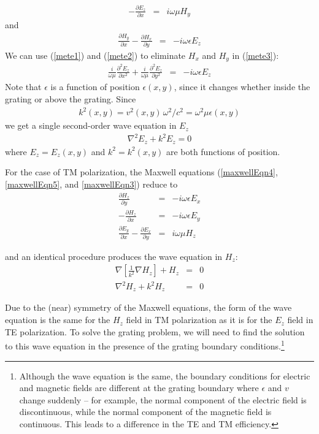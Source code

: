 \begin{eqnarray}
-\frac{\partial E_z}{\partial x} &=& i \omega \mu H_y
\label{mete2}
\end{eqnarray}
and
\begin{eqnarray}
\frac{\partial H_y}{\partial x} - \frac{\partial H_x}{\partial y} &=& - i \omega \epsilon E_z
\label{mete3}
\end{eqnarray}
We can use (\ref{mete1}) and (\ref{mete2}) to eliminate $H_x$ and $H_y$ in (\ref{mete3}):
\begin{eqnarray}
\frac{i}{\omega \mu} \frac{\partial^2 E_z}{\partial x^2} + \frac{i}{\omega \mu}  \frac{\partial^2 E_z}{\partial y^2} &=& -i \omega \epsilon E_z
\label{mete4}
\end{eqnarray}
Note that $\epsilon$ is a function of position $\epsilon(x,y)$, since it changes whether inside the grating or above the grating.  Since 
\begin{eqnarray}
k^2(x, y) = v^2(x,y)\, \omega^2/c^2 = \omega^2 \mu \epsilon(x, y)
\end{eqnarray}
we get a single second-order wave equation in $E_z$
\begin{eqnarray}
\nabla^2 E_z + k^2 E_z = 0
\label{wete}
\end{eqnarray}
where $E_z = E_z(x,y)$ and $k^2 = k^2(x,y)$ are both functions of position.


For the case of TM polarization, the Maxwell equations (\ref{maxwellEqn4}, \ref{maxwellEqn5}, and \ref{maxwellEqn3}) reduce to 
\begin{eqnarray}
\frac{\partial H_z}{\partial y} &=& -i \omega \epsilon E_x \\
-\frac{\partial H_z}{\partial x} &=& -i \omega \epsilon E_y \\
\frac{\partial E_y}{\partial x} - \frac{\partial E_x}{\partial y} &=& i \omega \mu H_z
\end{eqnarray}

and an identical procedure produces the wave equation in $H_z$:
\begin{eqnarray}
\label{wetm}
\nabla\left[  \frac{1}{k^2} \nabla H_z  \right] + H_z &=& 0 \\
\nabla^2 H_z + k^2 H_z &=& 0
\end{eqnarray}

Due to the (near) symmetry of the Maxwell equations, the form of the wave equation is the same for the $H_z$ field in TM polarization as it is for the $E_z$ field in TE polarization.  To solve the grating problem, we will need to find the solution to this wave equation in the presence of the grating boundary conditions.\footnote{Although the wave equation is the same, the boundary conditions for electric and magnetic fields are different at the grating boundary where $\epsilon$ and $v$ change suddenly -- for example, the normal component of the electric field is discontinuous, while the normal component of the magnetic field is continuous. This leads to a difference in the TE and TM efficiency.}
